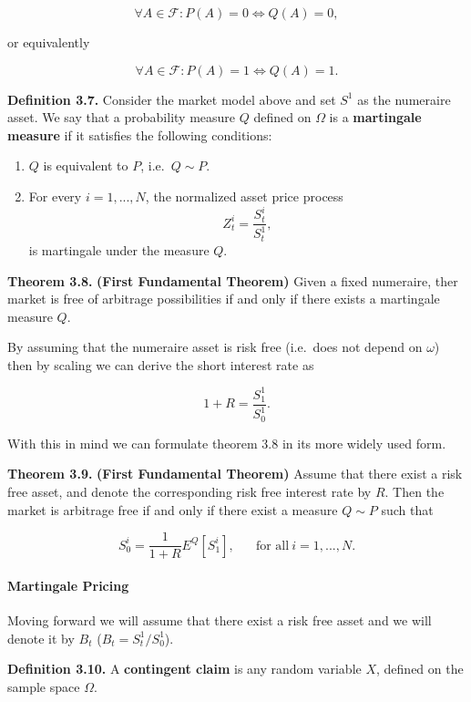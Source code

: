 \documentclass[
]{article}
\providecommand{\tightlist}{%
  \setlength{\itemsep}{0pt}\setlength{\parskip}{0pt}}
\begin{document}
\[
\forall A\in\mathcal{F}:P(A)=0\iff Q(A)=0,
\]

or equivalently

\[
\forall A\in\mathcal{F}:P(A)=1\iff Q(A)=1.
\]

\textbf{Definition 3.7.} Consider the market model above and set \(S^1\)
as the numeraire asset. We say that a probability measure \(Q\) defined
on \(\Omega\) is a \textbf{martingale measure} if it satisfies the
following conditions:

\begin{enumerate}
\def\labelenumi{\arabic{enumi}.}
\tightlist
\item
  \(Q\) is equivalent to \(P\), i.e.~\(Q\sim P\).
\item
  For every \(i=1,...,N\), the normalized asset price process \[
    Z_t^i=\frac{S_t^i}{S_t^1},
    \] is martingale under the measure \(Q\).
\end{enumerate}

\textbf{Theorem 3.8.} \textbf{(First Fundamental Theorem)} Given a fixed
numeraire, ther market is free of arbitrage possibilities if and only if
there exists a martingale measure \(Q\).

By assuming that the numeraire asset is risk free (i.e.~does not depend
on \(\omega\)) then by scaling we can derive the short interest rate as

\[
1+R=\frac{S_1^1}{S_0^1}.
\]

With this in mind we can formulate theorem 3.8 in its more widely used
form.

\textbf{Theorem 3.9.} \textbf{(First Fundamental Theorem)} Assume that
there exist a risk free asset, and denote the corresponding risk free
interest rate by \(R\). Then the market is arbitrage free if and only if
there exist a measure \(Q\sim P\) such that

\[
S_0^i=\frac{1}{1+R}E^Q[S_1^i],\hspace{20pt}\text{for all}\ i=1,...,N.\tag{3.9}
\]

\hypertarget{martingale-pricing}{%
\paragraph{Martingale Pricing}\label{martingale-pricing}}

Moving forward we will assume that there exist a risk free asset and we
will denote it by \(B_t\) (\(B_t=S^1_t/S^1_0\)).

\textbf{Definition 3.10.} A \textbf{contingent claim} is any random
variable \(X\), defined on the sample space \(\Omega\).
\end{document}
